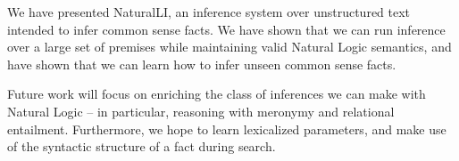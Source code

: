 We have presented NaturalLI, an inference system over
  unstructured text intended to infer common sense facts.
We have shown that we can run inference over a large set of premises
  while maintaining valid Natural Logic semantics, and have shown that
  we can learn how to infer unseen common sense facts.

Future work will focus on enriching the class of inferences we can
  make with Natural Logic -- in particular, reasoning with meronymy
  and relational entailment.
Furthermore, we hope to learn lexicalized parameters,
  and make use of the syntactic structure of a fact during search.
